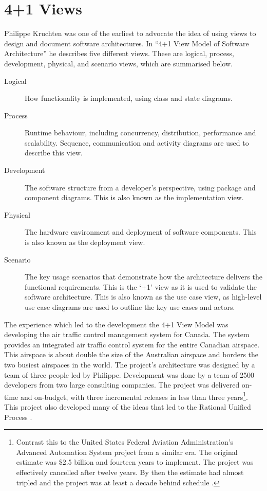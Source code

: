 \section{4+1 Views}
Philippe Kruchten was one of the earliest to advocate the idea of using views to design and document software architectures.
In ``4+1 View Model of Software Architecture'' \cite{4+1-model} he describes five different views.
These are logical, process, development, physical, and scenario views, which are summarised below.
\begin{description}
    \item[Logical] How functionality is implemented, using class and state diagrams.
    \item[Process] Runtime behaviour, including concurrency, distribution, performance and scalability.
                            Sequence, communication and activity diagrams are used to describe this view.
    \item[Development] The software structure from a developer's perspective, using package and component diagrams.
                                    This is also known as the implementation view.
    \item[Physical] The hardware environment and deployment of software components.
                            This is also known as the deployment view.
    \item[Scenario] The key usage scenarios that demonstrate how the architecture delivers the functional requirements.
                             This is the `+1' view as it is used to validate the software architecture.
                             This is also known as the use case view, as high-level use case diagrams are used to outline the key use cases and actors.
\end{description}
The experience which led to the development the 4+1 View Model was developing the air traffic control management system for Canada.
The system provides an integrated air traffic control system for the entire Canadian airspace.
This airspace is about double the size of the Australian airspace and borders the two busiest airspaces in the world.
The project's architecture was designed by a team of three people led by Philippe.
Development was done by a team of 2500 developers from two large consulting companies.
The project was delivered on-time and on-budget, with three incremental releases in less than three years\footnote{Contrast
this to the United States Federal Aviation Administration's Advanced Automation System project from a similar era.
The original estimate was \$2.5 billion and fourteen years to implement.
The project was effectively cancelled after twelve years.
By then the estimate had almost tripled and the project was at least a decade behind schedule \cite{faa-aas}.}.
This project also developed many of the ideas that led to the Rational Unified Process \cite{kruchten2004rational}.


